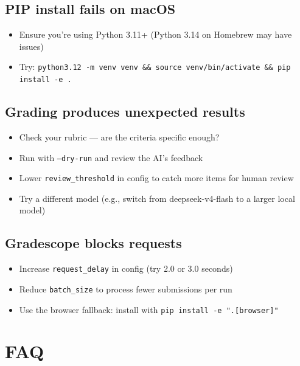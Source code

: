 \documentclass[11pt,a4paper]{article}
\begin{document}
\subsection{PIP install fails on macOS}

\begin{itemize}[itemsep=3pt]
    \item Ensure you're using Python 3.11+ (Python 3.14 on Homebrew may have issues)
    \item Try: \texttt{python3.12 -m venv venv \&\& source venv/bin/activate \&\& pip install -e .}
\end{itemize}

\subsection{Grading produces unexpected results}

\begin{itemize}[itemsep=3pt]
    \item Check your rubric — are the criteria specific enough?
    \item Run with \texttt{--dry-run} and review the AI's feedback
    \item Lower \texttt{review\_threshold} in config to catch more items for human review
    \item Try a different model (e.g., switch from deepseek-v4-flash to a larger local model)
\end{itemize}

\subsection{Gradescope blocks requests}

\begin{itemize}[itemsep=3pt]
    \item Increase \texttt{request\_delay} in config (try 2.0 or 3.0 seconds)
    \item Reduce \texttt{batch\_size} to process fewer submissions per run
    \item Use the browser fallback: install with \texttt{pip install -e ".[browser]"}
\end{itemize}

\section{FAQ}
\end{document}
